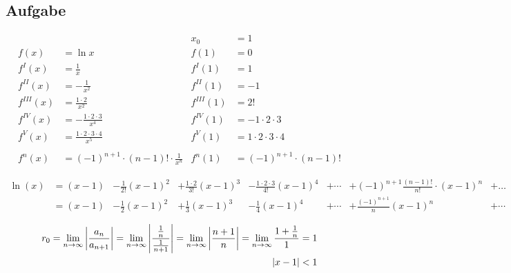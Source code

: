 \subsection{Aufgabe}

\begin{align*}
	           &                                                 & x_0        & = 1                         \\
	f(x)       & = \ln x                                         & f(1)       & = 0                         \\
	f^{I}(x)   & = \frac{1}{x}                                   & f^{I}(1)   & = 1                         \\
	f^{II}(x)  & = -\frac{1}{x^2}                                & f^{II}(1)  & = -1                        \\
	f^{III}(x) & = \frac{1 \cdot 2}{x^2}                         & f^{III}(1) & = 2!                        \\
	f^{IV}(x)  & = -\frac{1 \cdot 2 \cdot 3}{x^4}                & f^{IV}(1)  & = -1 \cdot 2 \cdot 3        \\
	f^{V}(x)   & = \frac{1 \cdot 2 \cdot 3 \cdot 4}{x^5}         & f^{V}(1)   & = 1 \cdot 2 \cdot 3 \cdot 4 \\
	\\
	f^n(x)     & = {(-1)}^{n+1} \cdot (n-1)! \cdot \frac{1}{x^n} & f^n(1)     & = {(-1)}^{n+1} \cdot (n-1)!
\end{align*}

\begin{align*}
	\ln(x)
	 & = (x - 1) & - \frac{1}{2!} {(x - 1)}^2 & + \frac{1 \cdot 2}{3!} {(x - 1)}^3 & - \frac{1 \cdot 2 \cdot 3}{4!} {(x - 1)}^4 & + \cdots & + {(-1)}^{n+1} \frac{(n-1)!}{n!} \cdot {(x - 1)}^n & + \ldots \\
	 & = (x - 1) & - \frac{1}{2} {(x - 1)}^2  & + \frac{1}{3} {(x - 1)}^3          & - \frac{1}{4} {(x - 1)}^4                  & + \cdots & + \frac{{(-1)}^{n+1}}{n} {(x - 1)}^n               & + \cdots
\end{align*}

\begin{align*}
	r_0 = \lim_{n \rightarrow{} \infty} \left| \frac{a_n}{a_{n+1}} \right|
	= \lim_{n \rightarrow{} \infty} \left| \frac{\frac{1}{n}}{\frac{1}{n+1}} \right|
	= \lim_{n \rightarrow{} \infty} \left| \frac{n+1}{n} \right|
	= \lim_{n \rightarrow{} \infty} \frac{1 + \frac{1}{n}}{1}
	= 1 \\
	\left| x - 1 \right| < 1
\end{align*}


